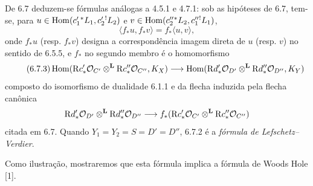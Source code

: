 De 6.7 deduzem-se fórmulas análogas a 4.5.1 e 4.7.1: sob as hipóteses de 6.7, tem-se, para $u\in\operatorname{Hom}(c_1'{}^*L_1,c_2'{}^!L_2)$ e $v\in\operatorname{Hom}(c_2''{}^*L_2,c_1''{}^!L_1)$,
\begin{equation}
\tag{6.7.2}
\langle f_*u,f_*v\rangle=f_*\langle u,v\rangle,
\end{equation}
onde $f_*u$ (resp. $f_*v$) designa a correspondência imagem direta de $u$ (resp. $v$) no sentido de 6.5.5, e $f_*$ no segundo membro é o homomorfismo
\begin{equation}
\tag{6.7.3}
\operatorname{Hom}(\mathrm{R} c'_*\mathcal{O}_{C'}\otimes^{\mathbf L}\mathrm{R} c''_*\mathcal{O}_{C''},K_X)
\longrightarrow
\operatorname{Hom}(\mathrm{R} d'_*\mathcal{O}_{D'}\otimes^{\mathbf L}\mathrm{R} d''_*\mathcal{O}_{D''},K_Y)
\end{equation}
composto do isomorfismo de dualidade 6.1.1 e da flecha induzida pela flecha canônica
\[
\mathrm{R} d'_*\mathcal{O}_{D'}\otimes^{\mathbf L}\mathrm{R} d''_*\mathcal{O}_{D''}\longrightarrow f_*(\mathrm{R} c'_*\mathcal{O}_{C'}\otimes^{\mathbf L}\mathrm{R} c''_*\mathcal{O}_{C''})
\]
citada em 6.7. Quando $Y_1=Y_2=S=D'=D''$, 6.7.2 é a \emph{fórmula de Lefschetz--Verdier}.

Como ilustração, mostraremos que esta fórmula implica a fórmula de Woods Hole [1].
